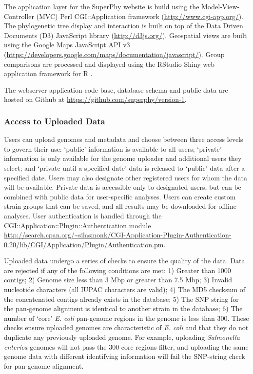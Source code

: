 \documentclass[doublespacing, linenumbers]{bmcart}
\begin{document}
The application layer for the SuperPhy website is build using the Model-View-Controller (MVC) Perl CGI::Application framework (\url{http://www.cgi-app.org/}). The phylogenetic tree display and interaction is built on top of the Data Driven Documents (D3) JavaScript library (\url{http://d3js.org/}). Geospatial views are built using the Google Maps JavaScript API v3 (\url{https://developers.google.com/maps/documentation/javascript/}). Group comparisons are processed and displayed using the RStudio Shiny web application framework for R \cite{racine_rstudio:_2012}.

The webserver application code base, database schema and public data are hosted on Github at \url{https://github.com/superphy/version-1}.

\subsubsection{Access to Uploaded Data}
Users can upload genomes and metadata and choose between three access levels to govern their use: `public' information is available to all users; `private' information is only available for the genome uploader and additional users they select; and `private until a specified date' data is released to `public' data after a specified date. Users may also designate other registered users for whom the data will be available. Private data is accessible only to designated users, but can be combined with public data for user-specific analyses. Users can create custom strain-groups that can be saved, and all results may be downloaded for offline analyses. User authentication is handled through the CGI::Application::Plugin::Authentication module \url{http://search.cpan.org/~silasmonk/CGI-Application-Plugin-Authentication-0.20/lib/CGI/Application/Plugin/Authentication.pm}. 

Uploaded data undergo a series of checks to ensure the quality of the data. Data are rejected if any of the following conditions are met: 1) Greater than 1000 contigs; 2) Genome size less than 3 Mbp or greater than 7.5 Mbp; 3) Invalid nucleotide characters (all IUPAC characters are valid); 4) The MD5 checksum of the concatenated contigs already exists in the database; 5) The SNP string for the pan-genome alignment is identical to another strain in the database; 6) The number of `core' \textit{E. coli} pan-genome regions in the genome is less than 300. These checks ensure uploaded genomes are characteristic of \textit{E. coli} and that they do not duplicate any previously uploaded genome. For example, uploading \textit{Salmonella enterica} genomes will not pass the 300 core regions filter, and uploading the same genome data with different identifying information will fail the SNP-string check for pan-genome alignment.
\end{document}
